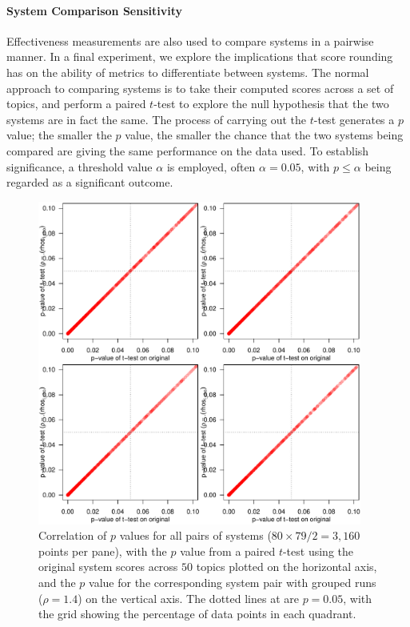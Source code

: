 \documentclass[runningheads,a4paper]{llncs}
\newcommand{\myparagraph}[1]{\vspace*{-0.7ex}\paragraph*{\normalsize\bf{#1}}}
\begin{document}
\myparagraph{System Comparison Sensitivity}

Effectiveness measurements are also used to compare systems in a
pairwise manner.
In a final experiment, we explore the implications that score
rounding has on the ability of metrics to differentiate between
systems.
The normal approach to comparing systems is to take their computed
scores across a set of topics, and perform a paired $t$-test to
explore the null hypothesis that the two systems are in fact the
same.
The process of carrying out the $t$-test generates a $p$ value; the
smaller the $p$ value, the smaller the chance that the two systems
being compared are giving the same performance on the data used.
To establish significance, a threshold value $\alpha$ is employed,
often $\alpha=0.05$, with $p\le\alpha$ being regarded as a
significant outcome.

\begin{figure}[t!]
\centering
\includegraphics[width=0.95\textwidth,page=5]{figs/p_value_scatter_sys_pairs.pdf}
\caption{Correlation of $p$ values for all pairs of systems
($80\times79/2=3{,}160$ points per pane), with the $p$ value from a
paired $t$-test using the original system scores across $50$ topics
plotted on the horizontal axis, and the $p$ value for the
corresponding system pair with grouped runs ($\rho=1.4$) on the
vertical axis.
The dotted lines at are $p=0.05$, with the grid showing the
percentage of data points in each quadrant.
\label{fig-pair-variation}}
\end{figure}
\end{document}
